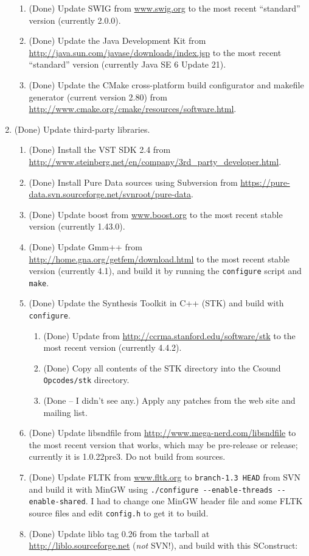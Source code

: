 \documentclass[11pt,letterpaper,onecolumn]{scrartcl}
\begin{document}
\begin{sloppypar}
\begin{enumerate}
\begin{enumerate}
	    \item (Done) Update SWIG from \url{www.swig.org} to the most recent ``standard'' version (currently 2.0.0).
	    \item (Done) Update the Java Development Kit from \url{http://java.sun.com/javase/downloads/index.jsp} to the most recent ``standard'' version (currently Java SE 6 Update 21).
	    \item (Done) Update the CMake cross-platform build configurator and makefile generator (current version 2.80) from \url{http://www.cmake.org/cmake/resources/software.html}.
		\end{enumerate}    
	\item (Done) Update third-party libraries.   
		\begin{enumerate}
    	\item (Done) Install the VST SDK 2.4 from \url{http://www.steinberg.net/en/company/3rd_party_developer.html}.
    	\item (Done) Install Pure Data sources using Subversion from \url{https://pure-data.svn.sourceforge.net/svnroot/pure-data}.
   		\item (Done) Update boost from \url{www.boost.org} to the most recent stable version (currently 1.43.0).
  		\item (Done) Update Gmm++ from \url{http://home.gna.org/getfem/download.html} to the most recent stable version (currently 4.1), and build it by running the \texttt{configure} script and \texttt{make}.
    	\item (Done) Update the Synthesis Toolkit in C++ (STK) and build with \texttt{configure}.
				\begin{enumerate}
					\item (Done) Update from \url{http://ccrma.stanford.edu/software/stk} to the most recent version (currently 4.4.2). 
					\item (Done) Copy all contents of the STK directory into the Csound \texttt{Opcodes/stk} directory.
					\item (Done -- I didn't see any.) Apply any patches from the web site and mailing list. 
				\end{enumerate}   	
			\item (Done) Update libsndfile from \url{http://www.mega-nerd.com/libsndfile} to the most recent version that works, which may be pre-release or release; currently it is 1.0.22pre3. Do not build from sources. 
    	\item (Done) Update FLTK from \url{www.fltk.org} to \texttt{branch-1.3 HEAD} from SVN and build it with MinGW using \verb|./configure --enable-threads --enable-shared|. I had to change one MinGW header file and some FLTK source files and edit \texttt{config.h} to get it to build.
     	\item (Done) Update liblo tag 0.26 from the tarball at \url{http://liblo.sourceforge.net} (\emph{not} SVN!), and build with this SConstruct:
    	

\end{enumerate}
\end{enumerate}
\end{sloppypar}
\end{document}
